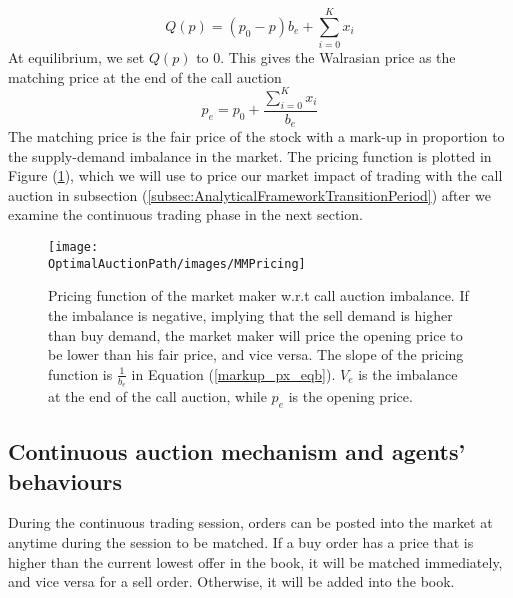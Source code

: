 \[
  Q(p) = (p_0 - p) b_e + \sum_{i=0}^K x_i
\]
At equilibrium, we set $Q(p)$ to 0. This gives the Walrasian price as the matching price at the end of the call auction
\begin{equation}\label{markup_px_eqb}
  p_e = p_0 + \frac{\sum_{i=0}^K x_i}{b_e}
\end{equation}
The matching price is the fair price of the stock with a mark-up in proportion to the supply-demand imbalance in the market. The pricing function is plotted in Figure (\ref{fig:mm_pricing_auction}), which we will use to price our market impact of trading with the call auction in subsection (\ref{subsec:AnalyticalFrameworkTransitionPeriod}) after we examine the continuous trading phase in the next section.

\begin{figure}[h]
  \texttt{[image: \\OptimalAuctionPath/images/MMPricing]}
  \caption{Pricing function of the market maker w.r.t call auction imbalance. If the imbalance is negative, implying that the sell demand is higher than buy demand, the market maker will price the opening price to be lower than his fair price, and vice versa. The slope of the pricing function is $\frac{1}{b_e}$ in Equation (\ref{markup_px_eqb}). $V_e$ is the imbalance at the end of the call auction, while $p_e$ is the opening price. }
  \label{fig:mm_pricing_auction}
\end{figure}

\subsection{Continuous auction mechanism and agents' behaviours}\label{subsec:AnalyticalFrameworkContinuousAuction}
During the continuous trading session, orders can be posted into the market at anytime during the session to be matched. If a buy order has a price that is higher than the current lowest offer in the book, it will be matched immediately, and vice versa for a sell order. Otherwise, it will be added into the book.

